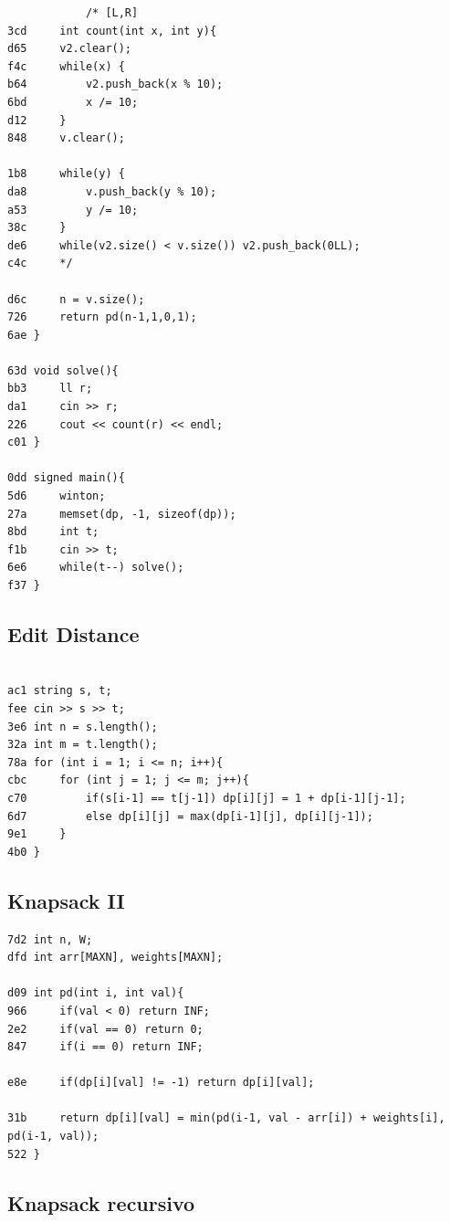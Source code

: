 \documentclass[11pt, a4paper, twoside]{article}
\begin{document}
{\begin{lstlisting}
            /* [L,R]
3cd     int count(int x, int y){
d65     v2.clear();
f4c     while(x) {
b64         v2.push_back(x % 10);
6bd         x /= 10;
d12     }
848     v.clear();
    
1b8     while(y) {
da8         v.push_back(y % 10);
a53         y /= 10;
38c     }
de6     while(v2.size() < v.size()) v2.push_back(0LL);
c4c     */
       
d6c     n = v.size();
726     return pd(n-1,1,0,1);
6ae }
    
63d void solve(){
bb3     ll r;
da1     cin >> r;
226     cout << count(r) << endl;
c01 }
    
0dd signed main(){
5d6     winton;
27a     memset(dp, -1, sizeof(dp));
8bd     int t;
f1b     cin >> t;
6e6     while(t--) solve();
f37 }
\end{lstlisting}

\subsection{Edit Distance}
\begin{lstlisting}

ac1 string s, t;
fee cin >> s >> t;
3e6 int n = s.length();
32a int m = t.length();
78a for (int i = 1; i <= n; i++){
cbc     for (int j = 1; j <= m; j++){
c70         if(s[i-1] == t[j-1]) dp[i][j] = 1 + dp[i-1][j-1];
6d7         else dp[i][j] = max(dp[i-1][j], dp[i][j-1]);
9e1     }
4b0 }
\end{lstlisting}

\subsection{Knapsack II}
\begin{lstlisting}
7d2 int n, W;
dfd int arr[MAXN], weights[MAXN];

d09 int pd(int i, int val){
966     if(val < 0) return INF;
2e2     if(val == 0) return 0;
847     if(i == 0) return INF;
    
e8e     if(dp[i][val] != -1) return dp[i][val];
    
31b     return dp[i][val] = min(pd(i-1, val - arr[i]) + weights[i], pd(i-1, val));
522 }
\end{lstlisting}

\subsection{Knapsack recursivo}
\begin{lstlisting}


\end{lstlisting}}
\end{document}
